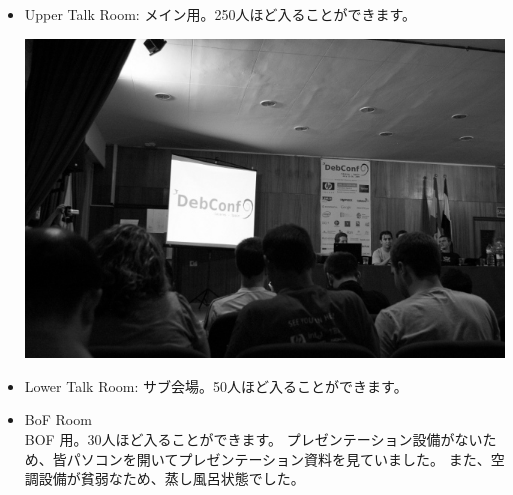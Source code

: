 \documentclass[mingoth,a4paper]{jsarticle}
\begin{document}
\begin{itemize}
  \item Upper Talk Room: 	メイン用。250人ほど入ることができます。\\
	\begin{minipage}{0.4\hsize}
	\includegraphics[width=0.8\hsize]{image200908/debconf9_main_mono.jpg}
	\end{minipage}
  \item Lower Talk Room: サブ会場。50人ほど入ることができます。

  \item BoF Room\\
	BOF 用。30人ほど入ることができます。
        プレゼンテーション設備がないため、皆パソコンを開いてプレゼンテーション資料を見ていました。
	また、空調設備が貧弱なため、蒸し風呂状態でした。


\end{itemize}
\end{document}
